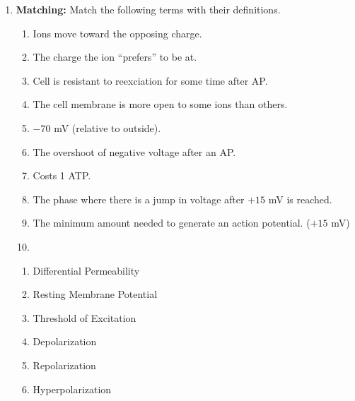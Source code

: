 \begin{enumerate}[label=\textbf{Q2.3.\arabic*}]
      \item \textbf{Matching:} Match the following terms with their definitions.
            \begin{wordbox}
                  \begin{enumerate}
                        \item Ions move toward the opposing charge.
                        \item The charge the ion ``prefers'' to be at.
                        \item Cell is resistant to reexciation for some time after AP.
                        \item The cell membrane is more open to some ions than others.
                        \item \(-70\) mV (relative to outside).
                        \item The overshoot of negative voltage after an AP.
                        \item Costs 1 ATP. 
                        \item The phase where there is a jump in voltage after \(+15\) mV is reached.
                        \item The minimum amount needed to generate an action potential. (\(+15\) mV)
                        \item {}
                  \end{enumerate}
            \end{wordbox}
            \begin{enumerate}[label=(\arabic*)]
                  \item Differential Permeability \quad \dotfill \quad {} \\
                  \item Resting Membrane Potential \quad \dotfill \quad {}\\
                  \item Threshold of Excitation \quad \dotfill \quad {}\\
                  \item Depolarization \quad \dotfill \quad {}\\
                  \item Repolarization \quad \dotfill \quad {}\\
                  \item Hyperpolarization \quad \dotfill \quad {}\\

\end{enumerate}
\end{enumerate}
